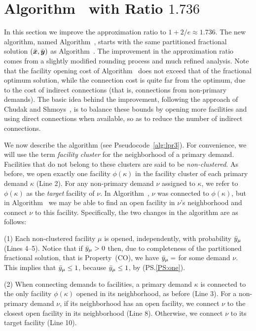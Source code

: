 \section{Algorithm~{\ECHS} with Ratio $1.736$}\label{sec: 1.736-approximation}

In this section we improve the approximation ratio to $1+2/e
\approx 1.736$. The new algorithm, named Algorithm~{\ECHS},
starts with the same partitioned fractional solution
$(\bar{\boldsymbol{x}}, \bar{\boldsymbol{y}})$ as Algorithm~{\EGUP}. The improvement
in the approximation ratio comes from a slightly modified
rounding process and much refined analysis.  Note that the
facility opening cost of Algorithm~{\EGUP} does not exceed
that of the fractional optimum solution, while the
connection cost is quite far from the optimum, due to the
cost of indirect connections (that is, connections from
non-primary demands).  The basic idea behind the
improvement, following the approach of Chudak and
Shmoys~\cite{ChudakS04}, is to balance these bounds by
opening more facilities
and using direct connections when available, so as to reduce
the number of indirect connections. 

We now describe the algorithm (see
Pseudocode~\ref{alg:lpr3}).  For convenience, we will use
the term \emph{facility cluster} for the neighborhood of a
primary demand. Facilities that do not belong to these
clusters are said to be \emph{non-clustered}.  As before, we
open exactly one facility $\phi(\kappa)$ in the facility
cluster of each primary demand $\kappa$ (Line 2).  For any
non-primary demand $\nu$ assigned to $\kappa$, we refer to
$\phi(\kappa)$ as the \emph{target} facility of $\nu$.  In
Algorithm~{\EGUP}, $\nu$ was connected to $\phi(\kappa)$,
but in Algorithm~{\ECHS} we may be able to find an open
facility in $\nu$'s neighborhood and connect $\nu$ to this
facility.  Specifically, the two changes in the
algorithm are as follows:
%
\begin{description}
	\item{(1)} Each non-clustered facility $\mu$ is opened,
independently, with probability ${\bar y}_{\mu}$ (Lines
4--5). Notice that if ${\bar y}_\mu>0$ then,
due to completeness of the partitioned
fractional solution, that is Property~(CO), we have ${\bar y}_{\mu}=$
for some demand $\nu$. This implies that ${\bar y}_{\mu}\leq 1$,
because ${\bar y}_{\mu}\le 1$, by (PS.\ref{PS:one}).
%
	\item{(2)} When connecting demands to facilities, a primary demand
$\kappa$ is connected to the only facility $\phi(\kappa)$
opened in its neighborhood, as before (Line 3).  For a
non-primary demand $\nu$, if its neighborhood has an open
facility, we connect $\nu$ to the closest open facility in
its neighborhood (Line 8). Otherwise, we connect $\nu$ to
its target facility (Line 10).
%
\end{description}

